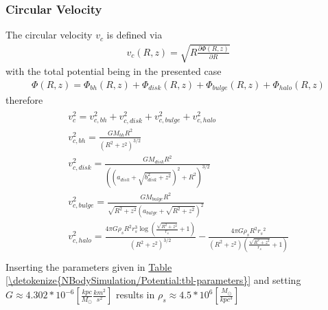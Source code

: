 \documentclass[letterpaper,10pt,english]{sphinxmanual}
\begin{document}
			\subsubsection{Circular Velocity}
				\label{\detokenize{NBodySimulation/Potential:circular-velocity}}
				\sphinxAtStartPar
				The circular velocity \(v_{c}\) is defined via
				\begin{equation}\label{equation:NBodySimulation/Potential:circular_velocity}
				\begin{split}v_{c}\left ( R,z \right ) = \sqrt{R\frac{\partial \Phi \left (R,z  \right )}{\partial R}   }\end{split}
				\end{equation}
				\sphinxAtStartPar
				with the total potential being in the presented case
				\begin{equation}\label{equation:NBodySimulation/Potential:total_potential}
				\begin{split}\Phi \left ( R,z \right ) = \Phi_{bh} \left ( R,z \right )+\Phi_{disk} \left ( R,z \right )+\Phi_{bulge} \left ( R,z \right )+\Phi_{halo} \left ( R,z \right )\end{split}
				\end{equation}
				\sphinxAtStartPar
				therefore
				\begin{align*}\!\begin{aligned}
				v_{c}^{2} = v_{c,bh}^{2}+v_{c,disk}^{2}+v_{c,bulge}^{2}+v_{c,halo}^{2}\\
				v_{c,bh}^{2} = \frac{G M_{bh} R^2}{\left(R^2+z^2\right)^{3/2}}\\
				v_{c,disk}^{2} = \frac{GM_{disk}R^2}{\left(\left(a_{disk}+\sqrt{b_{disk}^2+z^2}\right)^2+R^2\right)^{3/2}}\\
				v_{c,bulge}^{2} = \frac{G M_{bulge} R^2}{\sqrt{R^2+z^2} \left(a_{bulge}+\sqrt{R^2+z^2}\right)^2}\\
				v_{c,halo}^{2} = \frac{4 \pi G \rho _{s} R^2 r_{s}^3 \log \left(\frac{\sqrt{R^2+z^2}}{r_{s}}+1\right)}{\left(R^2+z^2\right)^{3/2}}-\frac{4\pi G\rho_{s} R^2 {r_{s}}^2}{\left(R^2+z^2\right) \left(\frac{\sqrt{R^2+z^2}}{r_{s}}+1\right)}\\
				\end{aligned}\end{align*}
				\sphinxAtStartPar
				Inserting the parameters given in \hyperref[\detokenize{NBodySimulation/Potential:tbl-parameters}]{Table \ref{\detokenize{NBodySimulation/Potential:tbl-parameters}}} and setting \(G\approx 4.302*10^{-6}\left [ \frac{kpc}{M_\odot}\frac{km^{2}}{s^{2}} \right ]\) results in \(\rho_{s}\approx 4.5*10^{6} \left [ \frac{M_\odot}{kpc^{3}} \right ]\)
				
\end{document}
